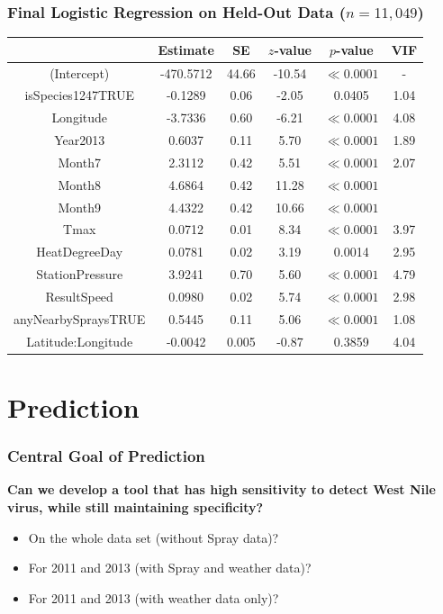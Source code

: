 \documentclass[handout]{beamer}
\begin{document}
\begin{frame}
\frametitle{Final Logistic Regression on Held-Out Data ($n=11,049$)}
\begin{center}
\begin{scriptsize}
\begin{tabular}{|c|cccc|c|} \hline
& Estimate & SE & $z$-value & $p$-value & VIF \\ \hline
(Intercept) & -470.5712 & 44.66 & -10.54 & $\ll 0.0001$ & - \\ 
isSpecies1247TRUE & -0.1289 & 0.06 & -2.05 & 0.0405 & 1.04\\ 
Longitude & -3.7336 & 0.60 & -6.21 & $\ll 0.0001$ & 4.08\\ 
Year2013 & 0.6037 & 0.11 & 5.70 & $\ll 0.0001$ & 1.89\\ 
Month7 & 2.3112 & 0.42 & 5.51 & $\ll 0.0001$ & 2.07\\ 
Month8 & 4.6864 & 0.42 & 11.28 & $\ll 0.0001$ & \\ 
Month9 & 4.4322 & 0.42 & 10.66 & $\ll 0.0001$ & \\ 
Tmax & 0.0712 & 0.01 & 8.34 & $\ll 0.0001$ & 3.97\\ 
HeatDegreeDay & 0.0781 & 0.02 & 3.19 & 0.0014 & 2.95\\ 
StationPressure & 3.9241 & 0.70 & 5.60 & $\ll 0.0001$ & 4.79\\ 
ResultSpeed & 0.0980 & 0.02 & 5.74 & $\ll 0.0001$ & 2.98\\ 
anyNearbySpraysTRUE & 0.5445 & 0.11 & 5.06 & $\ll 0.0001$ & 1.08\\ 
Latitude:Longitude & -0.0042 & 0.005 & -0.87 & 0.3859 & 4.04\\ \hline
\end{tabular}
\end{scriptsize}
\end{center}
\end{frame}

\section{Prediction}
\begin{frame}
\frametitle{Central Goal of Prediction}
\begin{center}
\textbf{Can we develop a tool that has high sensitivity to detect West Nile virus, while still maintaining specificity?}
\begin{scriptsize}
\begin{itemize}
\item On the whole data set (without Spray data)?
\item For 2011 and 2013 (with Spray and weather data)?
\item For 2011 and 2013 (with weather data only)?
\end{itemize}
\end{scriptsize}
\end{center}
\end{frame}
\end{document}
